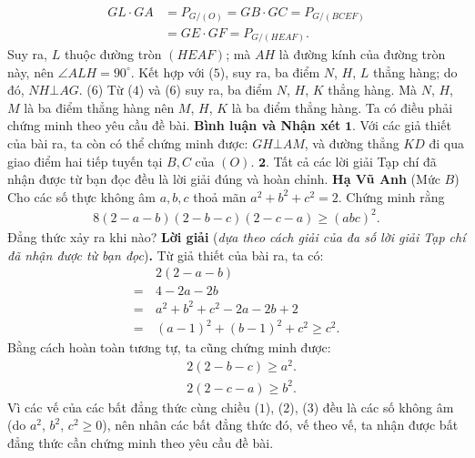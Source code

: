 \begin{multicols}{2}
	\begin{align*}
		GL \cdot GA &= {P_{G/(O)}} = GB \cdot GC = {P_{G/(BCEF)}} \\
		&= GE \cdot GF = {P_{G/(HEAF)}}.
	\end{align*}
	Suy ra, $L$ thuộc đường tròn $(HEAF)$; mà $AH$ là đường kính của đường tròn này, nên $\angle ALH = 90^\circ$. Kết hợp với ($5$), suy ra, ba điểm $N$, $H$, $L$ thẳng hàng; do đó, \linebreak$NH \bot AG$. \hfill ($6$)
	\vskip 0.05cm
	Từ ($4$) và ($6$) suy ra, ba điểm $N$, $H$, $K$ thẳng hàng. Mà $N$, $H$, $M$ là ba điểm thẳng hàng nên $M$, $H$, $K$ là ba điểm thẳng hàng. Ta có điều phải chứng minh theo yêu cầu đề bài.
	\vskip 0.05cm
	\textbf{\color{thachthuctoanhoc}Bình luận và Nhận xét}
	\vskip 0.05cm
	$\pmb{1.}$ Với các giả thiết của bài ra, ta còn có thể chứng minh được: $GH \bot AM$, và đường thẳng $KD$ đi qua giao điểm hai tiếp tuyến tại $B, C$ của $(O)$.
	\vskip 0.05cm
	$\pmb{2.}$ Tất cả các lời giải Tạp chí đã nhận được từ bạn đọc đều là lời giải đúng và hoàn chỉnh.
	\vskip 0.1cm
	\hfill	\textbf{\color{thachthuctoanhoc}Hạ Vũ Anh}
	\vskip 0.1cm
	{}
	(Mức $B$) Cho các số thực không âm $a,b,c$ thoả mãn $a^2+b^2+c^2=2$. Chứng minh rằng
	\begin{align*}
		8(2\!-\!a\!-\!b)(2\!-\!b\!-\!c)(2\!-\!c\!-\!a)\ge(abc)^2.
	\end{align*}
	Đẳng thức xảy ra khi nào?
	\vskip 0.05cm
	\textbf{\color{thachthuctoanhoc}Lời giải} (\textit{dựa theo cách giải của đa số lời giải Tạp chí đã nhận được từ bạn đọc})\textbf{\color{thachthuctoanhoc}.}
	\vskip 0.05cm
	Từ giả thiết của bài ra, ta có:
	\begin{align*}
		&2\left( {2 - a - b} \right) \\
		= \,&4 - 2a - 2b \\
		= \,&{a^2} + {b^2} + {c^2} - 2a - 2b + 2 \\
		= \,&{\left( {a - 1} \right)^2} + {\left( {b - 1} \right)^2} + {c^2} \ge {c^2}. \tag{$1$}
	\end{align*}
	Bằng cách hoàn toàn tương tự, ta cũng chứng minh được:
	\begin{align*}
		&2\left( {2 - b - c} \right) \ge {a^2}.\tag{$2$}\\
		&2\left( {2 - c - a} \right) \ge {b^2}.\tag{$3$}
	\end{align*}
	Vì các vế của các bất đẳng thức cùng chiều ($1$), ($2$), ($3$) đều là các số không âm (do  $a^2$, $b^2$, $c^2 \ge 0$), nên nhân các bất đẳng thức đó, vế theo vế, ta nhận được bất đẳng thức cần chứng minh theo yêu cầu đề bài.

\end{multicols}
